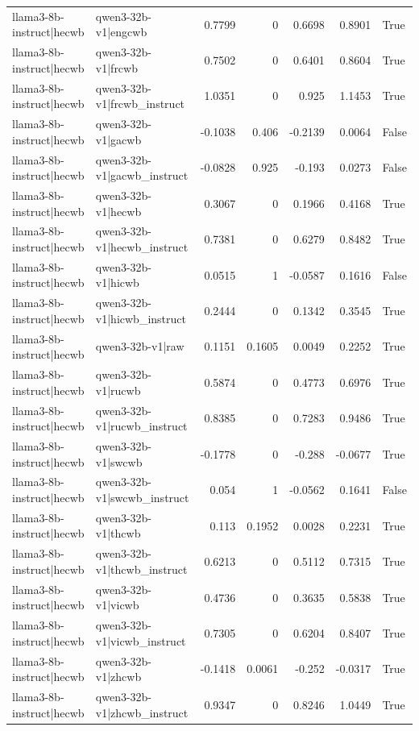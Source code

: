 \begin{table}
\begin{tabular}{l l r r r r l}
llama3-8b-instruct|hecwb & qwen3-32b-v1|engcwb & 0.7799 & 0 & 0.6698 & 0.8901 & True \\
llama3-8b-instruct|hecwb & qwen3-32b-v1|frcwb & 0.7502 & 0 & 0.6401 & 0.8604 & True \\
llama3-8b-instruct|hecwb & qwen3-32b-v1|frcwb_instruct & 1.0351 & 0 & 0.925 & 1.1453 & True \\
llama3-8b-instruct|hecwb & qwen3-32b-v1|gacwb & -0.1038 & 0.406 & -0.2139 & 0.0064 & False \\
llama3-8b-instruct|hecwb & qwen3-32b-v1|gacwb_instruct & -0.0828 & 0.925 & -0.193 & 0.0273 & False \\
llama3-8b-instruct|hecwb & qwen3-32b-v1|hecwb & 0.3067 & 0 & 0.1966 & 0.4168 & True \\
llama3-8b-instruct|hecwb & qwen3-32b-v1|hecwb_instruct & 0.7381 & 0 & 0.6279 & 0.8482 & True \\
llama3-8b-instruct|hecwb & qwen3-32b-v1|hicwb & 0.0515 & 1 & -0.0587 & 0.1616 & False \\
llama3-8b-instruct|hecwb & qwen3-32b-v1|hicwb_instruct & 0.2444 & 0 & 0.1342 & 0.3545 & True \\
llama3-8b-instruct|hecwb & qwen3-32b-v1|raw & 0.1151 & 0.1605 & 0.0049 & 0.2252 & True \\
llama3-8b-instruct|hecwb & qwen3-32b-v1|rucwb & 0.5874 & 0 & 0.4773 & 0.6976 & True \\
llama3-8b-instruct|hecwb & qwen3-32b-v1|rucwb_instruct & 0.8385 & 0 & 0.7283 & 0.9486 & True \\
llama3-8b-instruct|hecwb & qwen3-32b-v1|swcwb & -0.1778 & 0 & -0.288 & -0.0677 & True \\
llama3-8b-instruct|hecwb & qwen3-32b-v1|swcwb_instruct & 0.054 & 1 & -0.0562 & 0.1641 & False \\
llama3-8b-instruct|hecwb & qwen3-32b-v1|thcwb & 0.113 & 0.1952 & 0.0028 & 0.2231 & True \\
llama3-8b-instruct|hecwb & qwen3-32b-v1|thcwb_instruct & 0.6213 & 0 & 0.5112 & 0.7315 & True \\
llama3-8b-instruct|hecwb & qwen3-32b-v1|vicwb & 0.4736 & 0 & 0.3635 & 0.5838 & True \\
llama3-8b-instruct|hecwb & qwen3-32b-v1|vicwb_instruct & 0.7305 & 0 & 0.6204 & 0.8407 & True \\
llama3-8b-instruct|hecwb & qwen3-32b-v1|zhcwb & -0.1418 & 0.0061 & -0.252 & -0.0317 & True \\
llama3-8b-instruct|hecwb & qwen3-32b-v1|zhcwb_instruct & 0.9347 & 0 & 0.8246 & 1.0449 & True \\

\end{tabular}
\end{table}
